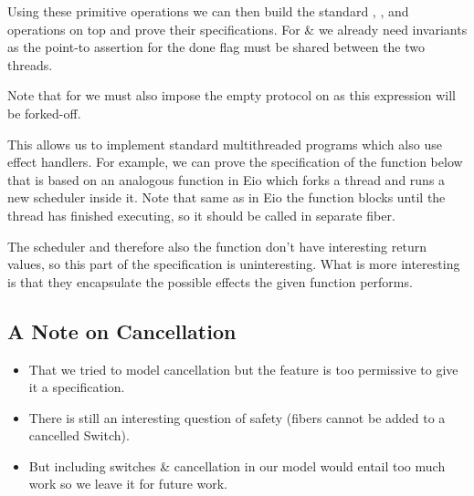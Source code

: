 
Using these primitive operations we can then build the standard , , and  operations on top and prove their specifications.
For  \&  we already need invariants as the point-to assertion for the done flag must be shared between the two threads.





Note that for  we must also impose the empty protocol on  as this expression will be forked-off.

This allows us to implement standard multithreaded programs which also use effect handlers.
For example, we can prove the specification of the function below that is based on an analogous function in Eio which forks a thread and runs a new scheduler inside it.
Note that same as in Eio the function blocks until the thread has finished executing, so it should be called in separate fiber.



The scheduler  and therefore also the  function don't have interesting return values, so this part of the specification is uninteresting.
What is more interesting is that they encapsulate the possible effects the given function  performs.

\subsection{A Note on Cancellation}
\label{sec:apdx-cancellation}

\begin{itemize}
  \item That we tried to model cancellation but the feature is too permissive to give it a specification.
  \item There is still an interesting question of safety (fibers cannot be added to a cancelled Switch).
  \item But including switches \& cancellation in our model would entail too much work so we leave it for future work.
\end{itemize}
